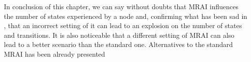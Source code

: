 In conclusion of this chapter, we can say without doubts that \ac{MRAI} influences
the number of states experienced by a node and, confirming what has been sad in
\cite{fabrikant2011there}, that an incorrect setting of it can lead
to an explosion on the number of states and transitions.
It is also noticeable that a different setting of \ac{MRAI} can also lead
to a better scenario than the standard one.
Alternatives to the standard \ac{MRAI} has been already presented 
